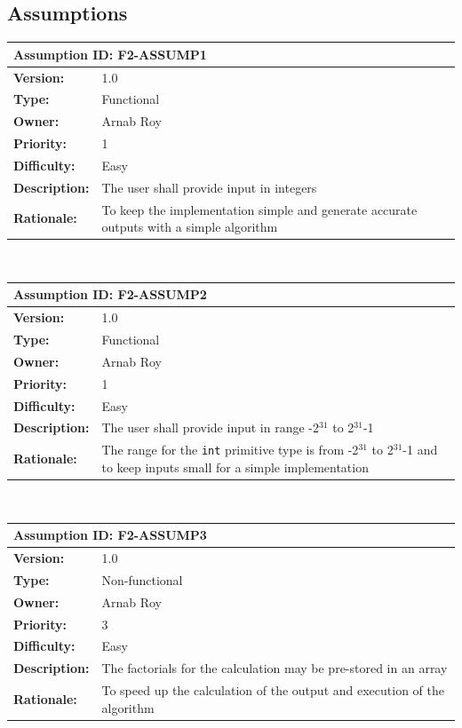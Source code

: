 \documentclass[paper=a4, fontsize=11pt,twoside]{scrartcl}	%
\begin{document}
    \subsection{Assumptions}
    \begin{tabular}{ |p{4cm} | p{10cm}| }
     \hline
     \multicolumn{2}{|l|}{\textbf{Assumption ID: F2-ASSUMP1}} \\
     \hline
     \textbf{Version:} & 1.0\\
     \textbf{Type:} & Functional\\
     \textbf{Owner:} & Arnab Roy\\
     \textbf{Priority:} & 1\\
     \textbf{Difficulty:} & Easy\\
     \textbf{Description:} & The user shall provide input in integers \\
     \textbf{Rationale:} & To keep the implementation simple and generate accurate outputs with a simple algorithm \\
     \hline
    \end{tabular}
    \\[10pt]
    \begin{tabular}{ |p{4cm} | p{10cm}| }
     \hline
     \multicolumn{2}{|l|}{\textbf{Assumption ID: F2-ASSUMP2}} \\
     \hline
     \textbf{Version:} & 1.0\\
     \textbf{Type:} & Functional\\
     \textbf{Owner:} & Arnab Roy\\
     \textbf{Priority:} & 1\\
     \textbf{Difficulty:} & Easy\\
     \textbf{Description:} & The user shall provide input in range -2$^{31}$ to 2$^{31}$-1 \\
     \textbf{Rationale:} & The range for the \texttt{int} primitive type is from -2$^{31}$ to 2$^{31}$-1 and to keep inputs small for a simple implementation\\
     \hline
    \end{tabular}
    \\[10pt]
    \begin{tabular}{ |p{4cm} | p{10cm}| }
     \hline
     \multicolumn{2}{|l|}{\textbf{Assumption ID: F2-ASSUMP3}} \\
     \hline
     \textbf{Version:} & 1.0\\
     \textbf{Type:} & Non-functional\\
     \textbf{Owner:} & Arnab Roy\\
     \textbf{Priority:} & 3\\
     \textbf{Difficulty:} & Easy\\
     \textbf{Description:} & The factorials for the calculation may be pre-stored in an array \\
     \textbf{Rationale:} & To speed up the calculation of the output and execution of the algorithm\\
     \hline
    \end{tabular}
\end{document}
